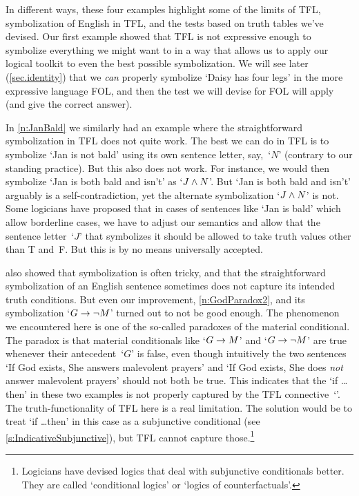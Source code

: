 In different ways, these four examples highlight some of the limits of
TFL, symbolization of English in TFL, and the tests based on truth
tables we've devised. Our first example showed that TFL is not
expressive enough to symbolize everything we might want to in a way
that allows us to apply our logical toolkit to even the best possible
symbolization. We will see later (\cref{sec.identity}) that we
\emph{can} properly symbolize `Daisy has four legs' in the more
expressive language FOL, and then the test we will devise for FOL will
apply (and give the correct answer).

In \cref{n:JanBald} we similarly had an example where the
straightforward symbolization in TFL does not quite work. The best we
can do in TFL is to symbolize `Jan is not bald' using its own sentence
letter, say,~`$N$' (contrary to our standing practice). But this also
does not work. For instance, we would then symbolize `Jan is both bald
and isn't' as `$J \wedge N$'. But `Jan is both bald and isn't' arguably
is a self-contradiction, yet the alternate symbolization `$J \wedge N$'
is not. Some logicians have proposed that in cases of sentences like
`Jan is bald' which allow borderline cases, we have to adjust our
semantics and allow that the sentence letter~`$J$' that symbolizes it
should be allowed to take truth values other than T and~F. But this is
by no means universally accepted.

 also showed that symbolization is often tricky,
and that the straightforward symbolization of an English sentence
sometimes does not capture its intended truth conditions. But even our
improvement, \cref{n:GodParadox2}, and its symbolization `$G \rightarrow
\neg M$' turned out to not be good enough. The phenomenon we
encountered here is one of the so-called paradoxes of the material
conditional. The paradox is that material conditionals like
`$G \rightarrow M$' and `$G \rightarrow \neg M$' are true whenever their
antecedent~`$G$' is false, even though intuitively the two sentences
`If God exists, She answers malevolent prayers' and `If God exists,
She does \emph{not} answer malevolent prayers' should not both be true. This
indicates that the `if \dots then' in these two examples is not
properly captured by the TFL connective~`\eif'. The
truth-functionality of TFL here is a real limitation. The solution
would be to treat `if \dots then' in this case as a subjunctive
conditional (see \cref{s:IndicativeSubjunctive}), but TFL cannot
capture those.\footnote{Logicians have devised logics that deal with
subjunctive conditionals better. They are called `conditional logics'
or `logics of counterfactuals'.}

